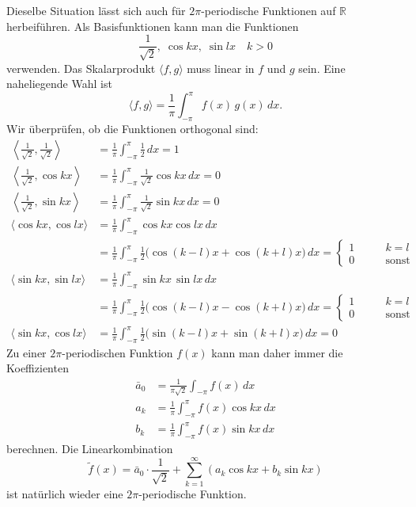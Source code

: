 Dieselbe Situation lässt sich auch für $2\pi$-periodische Funktionen 
auf $\mathbb R$ herbeiführen.
Als Basisfunktionen kann man die Funktionen 
\begin{equation}
\frac{1}{\sqrt{2}},\; \cos kx,\; \sin lx\quad k>0
\label{fourier:basis}
\end{equation}
verwenden.
Das Skalarprodukt $\langle f,g\rangle$ muss linear in $f$ und $g$ sein.
Eine naheliegende Wahl ist
\[
\langle f, g\rangle
=
\frac{1}{\pi}\int_{-\pi}^{\pi} f(x)\,g(x)\,dx.
\]
Wir überprüfen, ob die Funktionen orthogonal sind:
\begin{align*}
\left\langle \frac1{\sqrt{2}},\frac1{\sqrt{2}}\right\rangle
&=
\frac1{\pi}
\int_{-\pi}^{\pi} \frac12\,dx
=
1
\\
\left\langle \frac1{\sqrt{2}},\cos kx\right\rangle
&=
\frac1{\pi}\int_{-\pi}^{\pi}
\frac1{\sqrt{2}}\cos kx
\,dx
=0
\\
\left\langle \frac1{\sqrt{2}},\sin kx\right\rangle
&=
\frac1{\pi}\int_{-\pi}^{\pi}
\frac1{\sqrt{2}}\sin kx
\,dx
=0
\\
\langle \cos kx,\cos lx\rangle
&=
\frac1{\pi}
\int_{-\pi}^\pi \cos kx\cos lx\,dx
\\
&=
\frac1{\pi}
\int_{-\pi}^\pi
\frac12\bigl(
\cos (k-l)x+\cos (k+l)x
\bigr)
\,dx
=
\begin{cases}
1&\qquad k=l\\
0&\qquad\text{sonst}
\end{cases}
\\
\langle \sin kx,\sin lx\rangle
&=
\frac1{\pi}
\int_{-\pi}^\pi \sin kx\,\sin lx\,dx
\\
&=
\frac1{\pi}
\int_{-\pi}^\pi
\frac12
\bigl(
\cos (k-l)x - \cos (k+l)x
\bigr)
\,dx
=
\begin{cases}
1&\qquad k=l\\
0&\qquad\text{sonst}
\end{cases}
\\
\langle \sin kx,\cos lx\rangle
&=
\frac1{\pi}
\int_{-\pi}^{\pi} 
\frac12\bigl(
\sin (k-l)x + \sin (k+l)x
\bigr)
\,dx
=0
\end{align*}
Zu einer $2\pi$-periodischen Funktion $f(x)$ kann man daher immer
die Koeffizienten
\begin{equation}
\begin{aligned}
\bar{a}_0&=\frac1{\pi\sqrt{2}}\int_{-\pi}f(x)\,dx
\\
a_k&=\frac1{\pi}\int_{-\pi}^\pi f(x)\cos kx\,dx
\\
b_k&=\frac1{\pi}\int_{-\pi}^\pi f(x)\sin kx\,dx
\end{aligned}
\label{fourier:normalekoeffizienten}
\end{equation}
berechnen.
Die Linearkombination
\begin{equation}
\tilde f(x)
=
\bar{a}_0\cdot\frac1{\sqrt{2}}
+ 
\sum_{k=1}^\infty (a_k\cos kx+b_k\sin kx)
\label{fourier:reihe}
\end{equation}
ist natürlich wieder eine $2\pi$-periodische Funktion.

